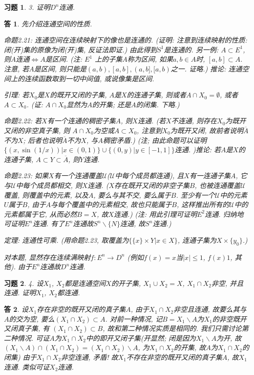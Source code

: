 \documentclass{ctexart}%
\newtheorem*{exercise}{习题}
\newtheorem*{solution}{答}
\theoremstyle{definition}
\theoremstyle{remark}
\begin{document}
\begin{exercise}3. 证明$D^n$连通.
\end{exercise}
\begin{solution}
先介绍连通空间的性质.

命题2.21: 连通空间在连续映射下的像也是连通的. (证明: 注意到连续映射的性质: 闭(开)集的原像为闭(开)集, 反证法即证.) 由此得到$S^1$是连通的. 另一例: $A\subset E^1$, 则$A$连通$\Longleftrightarrow A$是区间. (注:  $E^1$ 上的子集$A$称为区间, 如果$a, b\in A$时, $[a,b]\subset A$. 注意, 若$A$是区间, 则只能是$(a,b),[a,b],(a,b],[a,b)$之一. 证略.) 推论: 连通空间上的连续函数取到一切中间值, 或说像集是区间. 

引理: 若$X_0$是$X$的既开又闭的子集, $A$是$X$的连通子集, 则或者$A\cap X_0=\emptyset$, 或者$A\subset X_0$. (证: $A\cap X_0$显然为$A$的开集; 还是$A$的闭集. 下略.) 

命题2.22: 若$X$有一个连通的稠密子集$A$, 则$X$连通. (若$X$不连通, 则存在$X_0$为既开又闭的非空真子集, 则
$A\cap X_0$为空或$A\subset X_0$, 注意到$X_0$为既开又闭, 故前者说明$\overline{A}$不为$X$; 后者也说明$\overline{A}$不为$X$, 与$A$稠密矛盾.) (注; 由此命题可以证明$\{(x,\sin (1/x))|x\in (0,1)\}\cup \{(0,y)|y\in[-1,1]\}$连通. )推论: 若$A$是$X$的连通子集, $A\subset Y\subset \overline{A}$, 则$Y$连通. 

命题2.23: 如果$X$有一个连通覆盖$\mathscr{U}$($\mathscr{U}$中每个成员都连通), 且$X$有一连通子集$A$, 它与$\mathscr{U}$中每个成员都相交, 则$X$连通. ($X$存在既开又闭的非空子集$B$, 也被连通覆盖$\mathscr{U}$覆盖, 
则覆盖中的元素, 以及$A$, 要么与其不交, 要么属于$B$. 至少有一个$\mathscr{U}$中的元素$U$属于$B$, 由于$A$与每个覆盖中的元素相交, 故也只能属于$B$, 这样推出所有的$\mathscr{U}$中的元素都属于它, 从而必然$B=X$, 故$X$连通.) (注: 用此引理可证明$E^2$连通. 归纳地可证明$E^n$连通. 有了$E^n$连通故$S^n\backslash \{N\}$连通, 故$S^n$连通.)

定理: 连通性可乘. (用命题2.23, 取覆盖为$\{\{x\}\times Y|x\in X\}$, 连通子集为$X\times \{y_0\}$.)

对本题, 显然存在连续满映射$f: E^n\rightarrow D^n$ (例如$f(x)=x$当$|x|\leq 1$, $f(x)1$, 其他). 由于$E^n$连通故$D^n$连通.  
\end{solution}

\begin{exercise}4. 设$X_1$, $X_2$都是连通空间$X$的开子集, $X_1\cup X_2= X$, $X_1\cap X_2$非空, 并且连通. 证明$X_1$, $X_2$都连通.
\end{exercise}
\begin{solution}设$X_1$存在非空的既开又闭的真子集$A$, 由于$X_1\cap X_2$非空且连通, 故要么其与$A$的交为空, 要么$(X_1\cap X_2)\subset A$. 对前一种情况, 记$B=X_1\backslash A$为$X_1$的非空既开又闭真子集, 有 $(X_1\cap X_2)\subset B$, 故和第二种情况实质是相同的. 我们只需讨论第二种情况.  
可证$A$为$X_1\cap X_2$中的即开又闭子集(开显然; 闭是因为$X_1\backslash A$为开, 故$(X_1\backslash A) \cap (X_1\cap X_2)= (X_1\cap X_2)\backslash A$, 为$X_1\cap X_2$的开集, 故$A$为$X_1\cap X_2$的闭集)
 由于$X_1\cap X_2$非空连通, 矛盾! 故$X_1$不存在非空的既开又闭的真子集$A$, 故$X_1$连通. 类似可证$X_2$连通.
\end{solution}
\end{document}
